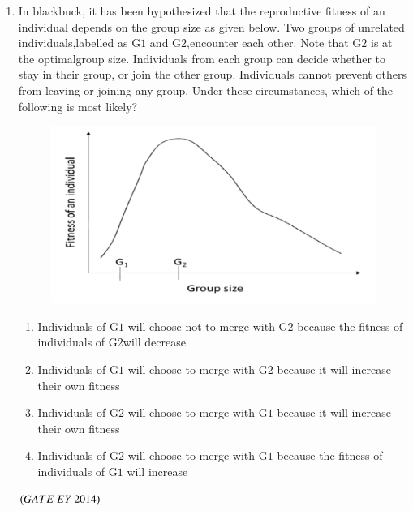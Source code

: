 \documentclass[journal]{IEEEtran}
\numberwithin{equation}{enumi}
\numberwithin{figure}{enumi}
\begin{document}
\begin{enumerate}
    \item In blackbuck, it has been hypothesized that the reproductive fitness of an individual depends on the group size as given below. Two groups of unrelated individuals,labelled as G$1$ and G$2$,encounter each other. Note that G$2$ is at the optimalgroup size. Individuals from each group can decide whether to stay in their group, or join the other group. Individuals cannot prevent others from leaving or joining any group. Under these circumstances, which of the following is most likely?
    \begin{figure}[H]
    \centering
    \includegraphics[width=0.7\columnwidth]{figs/6.png}
    \caption{}
    \label{fig:6}
   \end{figure}
   \begin{enumerate}
    
        \item Individuals of G$1$ will choose not to merge with G$2$ because the fitness of individuals of G$2$will decrease
        \item Individuals of G$1$ will choose to merge with G$2$ because it will increase their own fitness
        \item Individuals of G$2$ will choose to merge with G$1$ because it will increase their own fitness
        \item Individuals of G$2$ will choose to merge with G$1$ because the fitness of individuals of G$1$ will increase
    \end{enumerate}
    \hfill{$\brak{ GATE\ EY\ 2014}$}
    \bigskip
    

\end{enumerate}
\end{document}
